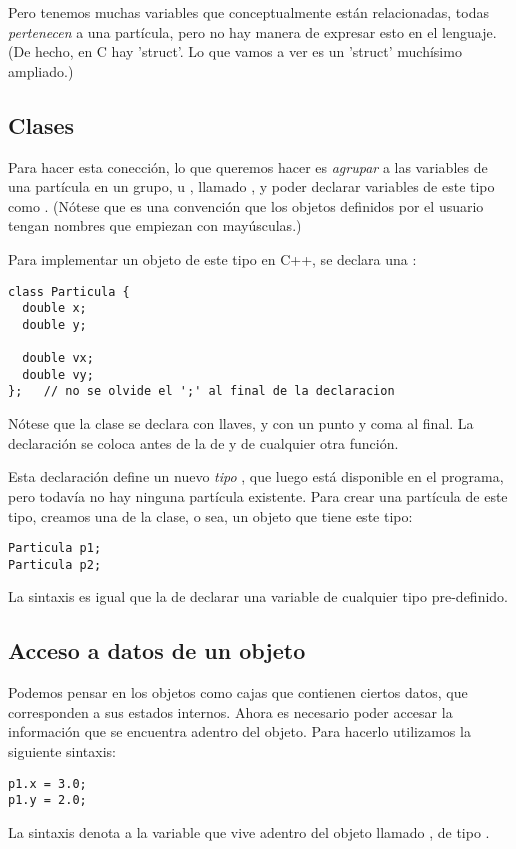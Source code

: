 Pero tenemos muchas
variables que conceptualmente están relacionadas, todas \textit{pertenecen}
a una partícula, pero no hay manera de expresar esto en el lenguaje.
(De hecho, en C hay 'struct'.  Lo que vamos a ver es un 'struct'
  muchísimo ampliado.)

\subsection{Clases}

Para hacer esta conección, lo que queremos hacer es \emph{agrupar} a las variables de una partícula en un grupo, u , 
llamado , y poder declarar variables de este tipo como . (Nótese que es una convención que los objetos definidos por el usuario tengan nombres que empiezan con mayúsculas.)

Para implementar un objeto de este tipo en C++, se declara una :
\begin{lstlisting}
class Particula {
  double x;
  double y;

  double vx;
  double vy;  
};   // no se olvide el ';' al final de la declaracion
\end{lstlisting}
Nótese que la clase se declara con llaves, y con un punto y coma al final.
La declaración se coloca antes de la de  y de cualquier otra función.


Esta declaración define un nuevo \emph{tipo} , que luego está disponible en el programa,
pero todavía no hay ninguna partícula existente. Para crear una partícula de este tipo, creamos una
 de la clase, o sea, un objeto que tiene este tipo:
\begin{lstlisting}
Particula p1;
Particula p2;
\end{lstlisting}
La sintaxis es igual que la de declarar una variable de cualquier tipo pre-definido.

\subsection{Acceso a datos de un objeto}

Podemos pensar en los objetos como cajas que contienen ciertos datos, que corresponden a sus estados internos.
Ahora es necesario poder accesar la información que se encuentra adentro del objeto.  Para hacerlo utilizamos la siguiente sintaxis:
\begin{lstlisting}
p1.x = 3.0;
p1.y = 2.0; 
\end{lstlisting}
La sintaxis  denota a la variable  que vive adentro del objeto llamado , de tipo .



